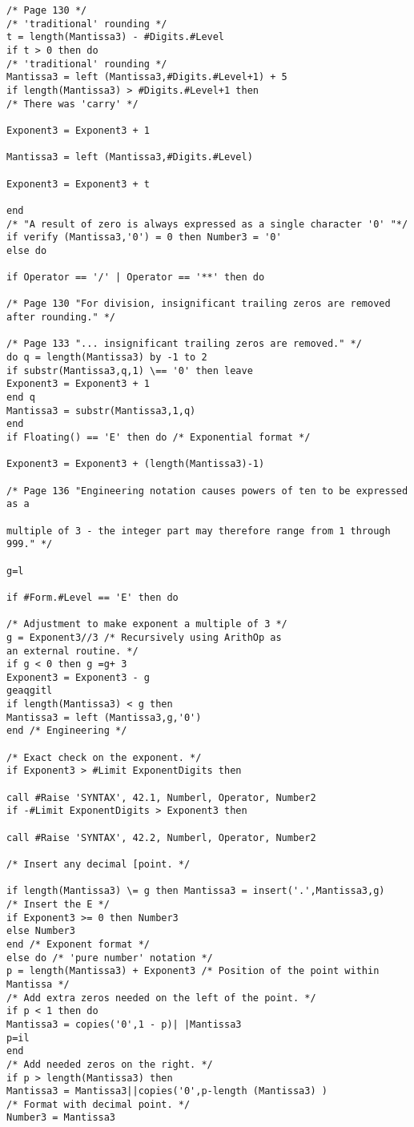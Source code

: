 \begin{verbatim}
/* Page 130 */
/* 'traditional' rounding */
t = length(Mantissa3) - #Digits.#Level
if t > 0 then do
/* 'traditional' rounding */
Mantissa3 = left (Mantissa3,#Digits.#Level+1) + 5
if length(Mantissa3) > #Digits.#Level+1 then
/* There was 'carry' */

Exponent3 = Exponent3 + 1

Mantissa3 = left (Mantissa3,#Digits.#Level)

Exponent3 = Exponent3 + t

end
/* "A result of zero is always expressed as a single character '0' "*/
if verify (Mantissa3,'0') = 0 then Number3 = '0'
else do

if Operator == '/' | Operator == '**' then do

/* Page 130 "For division, insignificant trailing zeros are removed
after rounding." */

/* Page 133 "... insignificant trailing zeros are removed." */
do q = length(Mantissa3) by -1 to 2
if substr(Mantissa3,q,1) \== '0' then leave
Exponent3 = Exponent3 + 1
end q
Mantissa3 = substr(Mantissa3,1,q)
end
if Floating() == 'E' then do /* Exponential format */

Exponent3 = Exponent3 + (length(Mantissa3)-1)

/* Page 136 "Engineering notation causes powers of ten to be expressed as a

multiple of 3 - the integer part may therefore range from 1 through
999." */

g=l

if #Form.#Level == 'E' then do

/* Adjustment to make exponent a multiple of 3 */
g = Exponent3//3 /* Recursively using ArithOp as
an external routine. */
if g < 0 then g =g+ 3
Exponent3 = Exponent3 - g
geaqgitl
if length(Mantissa3) < g then
Mantissa3 = left (Mantissa3,g,'0')
end /* Engineering */

/* Exact check on the exponent. */
if Exponent3 > #Limit ExponentDigits then

call #Raise 'SYNTAX', 42.1, Numberl, Operator, Number2
if -#Limit ExponentDigits > Exponent3 then

call #Raise 'SYNTAX', 42.2, Numberl, Operator, Number2

/* Insert any decimal [point. */

if length(Mantissa3) \= g then Mantissa3 = insert('.',Mantissa3,g)
/* Insert the E */
if Exponent3 >= 0 then Number3
else Number3
end /* Exponent format */
else do /* 'pure number' notation */
p = length(Mantissa3) + Exponent3 /* Position of the point within
Mantissa */
/* Add extra zeros needed on the left of the point. */
if p < 1 then do
Mantissa3 = copies('0',1 - p)| |Mantissa3
p=il
end
/* Add needed zeros on the right. */
if p > length(Mantissa3) then
Mantissa3 = Mantissa3||copies('0',p-length (Mantissa3) )
/* Format with decimal point. */
Number3 = Mantissa3


\end{verbatim}

